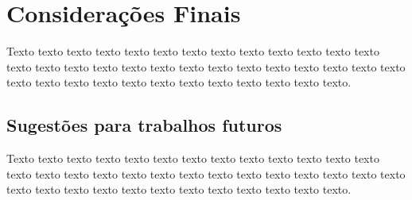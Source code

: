 \chapter{Considerações Finais}
\label{cap:consideracoes-finais}

Texto texto texto texto texto texto texto texto texto texto texto texto texto texto texto texto texto texto texto texto texto texto texto texto texto texto texto texto texto texto texto texto texto texto texto texto texto texto texto.

\section{Sugestões para trabalhos futuros}
\label{sec:trabalhos-futuros}

Texto texto texto texto texto texto texto texto texto texto texto texto texto texto texto texto texto texto texto texto texto texto texto texto texto texto texto texto texto texto texto texto texto texto texto texto texto texto texto.

